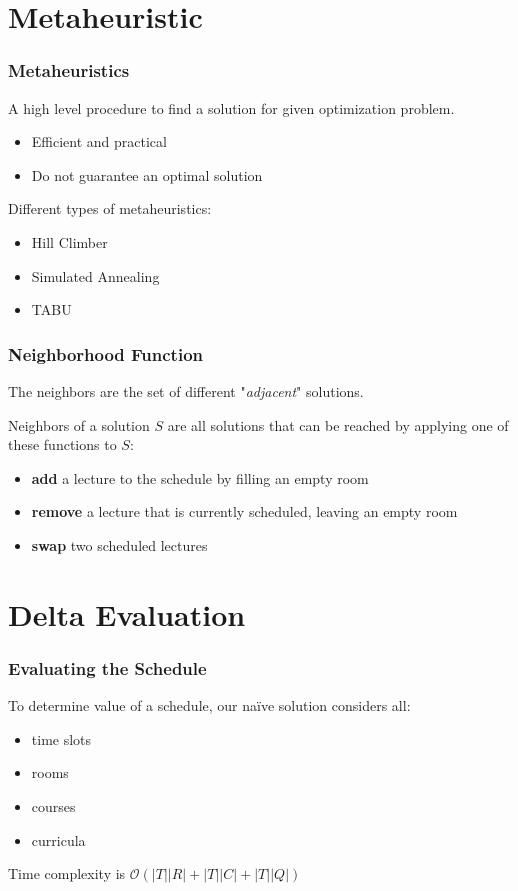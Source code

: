 \documentclass{beamer}
\begin{document}
\section{Metaheuristic} 
\begin{frame}
\frametitle{Metaheuristics}
A high level procedure to find a solution for given optimization problem.
\begin{itemize}
\item Efficient and practical 
\item Do not guarantee an optimal solution
\end{itemize}
Different types of metaheuristics:
\begin{itemize}
\item Hill Climber
\item Simulated Annealing
\item TABU
\end{itemize}
\end{frame}



\begin{frame}
	\frametitle{Neighborhood Function}
	The neighbors are the set of different "\textit{adjacent}" solutions.
	
	Neighbors of a solution $S$ are all solutions that can be reached by applying one of these functions to $S$:
	\begin{itemize}
		\item \textbf{add} a lecture to the schedule by filling an empty room
		\item \textbf{remove} a lecture that is currently scheduled, leaving an empty room
		\item \textbf{swap} two scheduled lectures
	\end{itemize}
\end{frame}


\section{Delta Evaluation}
\begin{frame}
	\frametitle{Evaluating the Schedule}
	To determine value of a schedule, our na{\"i}ve solution considers all:
	\begin{itemize}
		\item time slots
		\item rooms
		\item courses
		\item curricula
	\end{itemize}
	
	Time complexity is $\mathcal{O}(|T||R| + |T||C| + |T||Q|)$
\end{frame}
\end{document}
